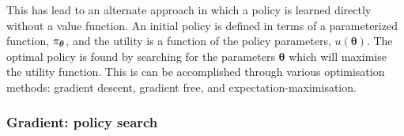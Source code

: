 This has lead to an alternate approach in which a policy is learned directly without a value function. An 
initial policy is defined in terms of a parameterized function, $\operatorname{\pi_{\boldsymbol{\theta}}}$, and the utility is a function of the 
policy parameters, $u(\boldsymbol{\theta})$. The optimal policy is found by searching for the parameters $\boldsymbol{\theta}$ which 
will maximise the utility function. This is can be accomplished through various optimisation methods: gradient descent, gradient free, 
and expectation-maximisation.

\subsubsection{Gradient: policy search}

